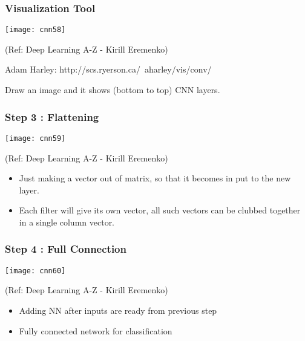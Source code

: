 \begin{frame}[fragile] \frametitle{Visualization Tool}


\begin{center}
\texttt{[image: cnn58]}

\tiny{(Ref: Deep Learning A-Z - Kirill Eremenko)}
\end{center}

Adam Harley: http://scs.ryerson.ca/~aharley/vis/conv/

Draw an image and it shows (bottom to top) CNN layers.

\end{frame}

\begin{frame}[fragile] \frametitle{Step 3 : Flattening}

\begin{center}
\texttt{[image: cnn59]}

\tiny{(Ref: Deep Learning A-Z - Kirill Eremenko)}
\end{center}

\begin{itemize}
\item Just making a vector out of matrix, so that it becomes in put to the new layer.
\item Each filter will give its own vector, all such vectors can be clubbed together in a single column vector.
\end{itemize}

\end{frame}

\begin{frame}[fragile] \frametitle{Step 4 : Full Connection}

\begin{center}
\texttt{[image: cnn60]}

\tiny{(Ref: Deep Learning A-Z - Kirill Eremenko)}
\end{center}

\begin{itemize}
\item Adding NN after inputs are ready from previous step
\item Fully connected network for classification
\end{itemize}

\end{frame}

